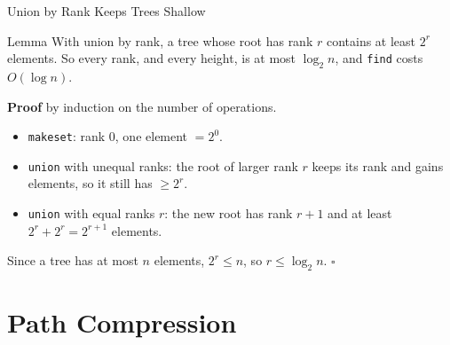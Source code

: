 \documentclass[10pt,aspectratio=169]{beamer}
\begin{document}
\begin{frame}{Union by Rank Keeps Trees Shallow}
  \begin{block}{Lemma}
    With union by rank, a tree whose root has rank $r$ contains at least
    $2^r$ elements. So every rank, and every height, is at most $\log_2 n$,
    and \texttt{find} costs $O(\log n)$.
  \end{block}

  \pause
  \textbf{Proof} by induction on the number of operations.
  \begin{itemize}
    \item \texttt{makeset}: rank $0$, one element $= 2^0$.
    \item \texttt{union} with unequal ranks: the root of larger rank $r$ keeps
          its rank and gains elements, so it still has $\ge 2^r$.
    \item \texttt{union} with equal ranks $r$: the new root has rank $r + 1$
          and at least $2^r + 2^r = 2^{r+1}$ elements.
  \end{itemize}
  Since a tree has at most $n$ elements, $2^r \le n$, so $r \le \log_2 n$.
  \hfill $\square$
\end{frame}

\section{Path Compression}
\end{document}
